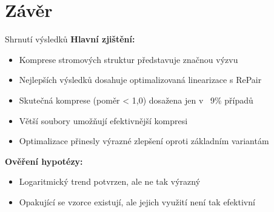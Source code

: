 \documentclass[lualatex,hyperref={pdfencoding=auto}]{beamer}
\begin{document}
\section{Závěr}
\begin{frame}{Shrnutí výsledků}
  \textbf{Hlavní zjištění:}
  \begin{itemize}
    \item Komprese stromových struktur představuje značnou výzvu
    \item Nejlepších výsledků dosahuje optimalizovaná linearizace s RePair
    \item Skutečná komprese (poměr < 1,0) dosažena jen v ~9\% případů
    \item Větší soubory umožňují efektivnější kompresi
    \item Optimalizace přinesly výrazné zlepšení oproti základním variantám
  \end{itemize}
  \vspace{3mm}
  \textbf{Ověření hypotézy:}
  \begin{itemize}
    \item Logaritmický trend potvrzen, ale ne tak výrazný
    \item Opakující se vzorce existují, ale jejich využití není tak efektivní
  \end{itemize}
\end{frame}
\end{document}
